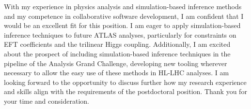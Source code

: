 \documentclass[11pt, a4paper]{awesome-cv}
\begin{document}
\begin{cvletter}
With my experience in physics analysis and simulation-based inference methods and my competence in collaborative software development, I am confident that I would be an excellent fit for this position. I am eager to apply simulation-based inference techniques to future ATLAS analyses, particularly for constraints on EFT coefficients and the trilinear Higgs coupling. Additionally, I am excited about the prospect of including simulation-based inference techniques in the pipeline of the Analysis Grand Challenge, developing new tooling wherever necessary to allow the easy use of these methods in HL-LHC analyses. I am looking forward to the opportunity to discuss further how my research experience and skills align with the requirements of the postdoctoral position. Thank you for your time and consideration.

\end{cvletter}


\makeletterclosing
\end{document}
